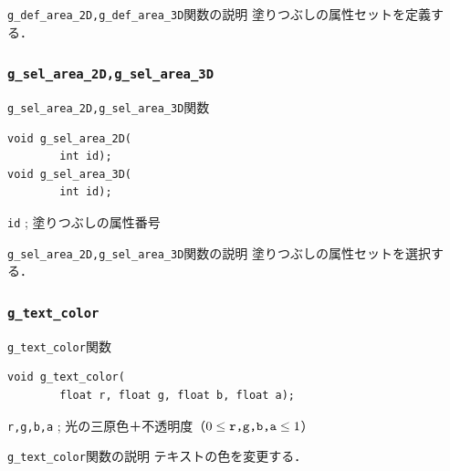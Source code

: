\documentclass[platex,a4paper,12pt]{jsarticle}%
\begin{document}
\begin{itembox}[l]{\texttt{g\_def\_area\_2D,g\_def\_area\_3D}関数の説明}
塗りつぶしの属性セットを定義する．
\end{itembox}

\subsubsection{\texttt{g\_sel\_area\_2D,g\_sel\_area\_3D}}

\begin{itembox}[l]{\texttt{g\_sel\_area\_2D,g\_sel\_area\_3D}関数}
\begin{verbatim}
void g_sel_area_2D(
        int id);
void g_sel_area_3D(
        int id);
\end{verbatim}
\verb|id| ; 塗りつぶしの属性番号
\end{itembox}

\begin{itembox}[l]{\texttt{g\_sel\_area\_2D,g\_sel\_area\_3D}関数の説明}
塗りつぶしの属性セットを選択する．
\end{itembox}


\clearpage
\subsubsection{\texttt{g\_text\_color}}

\begin{itembox}[l]{\texttt{g\_text\_color}関数}
\begin{verbatim}
void g_text_color(
        float r, float g, float b, float a);
\end{verbatim}
\verb|r,g,b,a| ; 光の三原色＋不透明度（$0\leq \verb|r,g,b,a| \leq 1$）\\
\end{itembox}

\begin{itembox}[l]{\texttt{g\_text\_color}関数の説明}
テキストの色を変更する．
\end{itembox}
\end{document}
